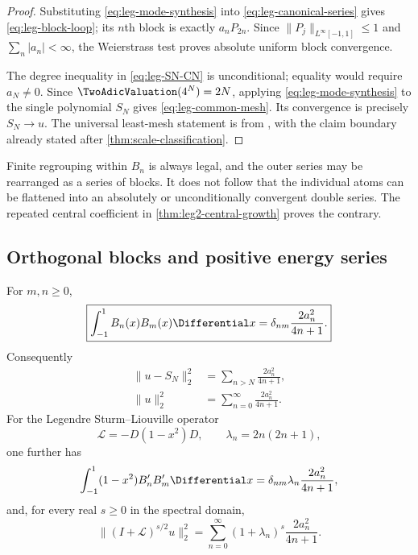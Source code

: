 \begin{proof}
Substituting \eqref{eq:leg-mode-synthesis} into
\eqref{eq:leg-canonical-series} gives \eqref{eq:leg-block-loop}; its $n$th
block is exactly $a_nP_{2n}$.  Since
$\|P_j\|_{L^\infty[-1,1]}\le1$ and $\sum_n|a_n|<\infty$, the Weierstrass
test proves absolute uniform block convergence.

The degree inequality in \eqref{eq:leg-SN-CN} is unconditional; equality
would require $a_N\ne0$.  Since $\TwoAdicValuation(4^N)=2N$, applying
\eqref{eq:leg-mode-synthesis} to the single polynomial $S_N$ gives
\eqref{eq:leg-common-mesh}.  Its convergence is precisely
$S_N\to u$.  The universal least-mesh statement is
 from
, with the claim boundary already stated
after \cref{thm:scale-classification}.
\end{proof}

\begin{warning}
Finite regrouping within $B_n$ is always legal, and the outer series may be
rearranged as a series of blocks.  It does not follow that the individual
atoms can be flattened into an absolutely or unconditionally convergent
double series.  The repeated central coefficient in
 \cref{thm:leg2-central-growth} proves the contrary.
\end{warning}

\subsection{Orthogonal blocks and positive energy series}

\begin{theorem}
\label{thm:leg-block-orthogonality}
For $m,n\ge0$,
\begin{equation}
 \boxed{
 \int_{-1}^{1}B_n(x)B_m(x)\Differential x
 =\delta_{nm}\frac{2a_n^2}{4n+1}.}
 \label{eq:leg-block-orthogonality}
\end{equation}
Consequently
\begin{align}
 \|u-S_N\|_2^2
 &=\sum_{n>N}\frac{2a_n^2}{4n+1},
 \label{eq:leg-L2-tail}\\
 \|u\|_2^2
 &=\sum_{n=0}^{\infty}\frac{2a_n^2}{4n+1}.
 \label{eq:leg-parseval}
\end{align}
For the Legendre Sturm--Liouville operator
\[
 \mathcal L=-D(1-x^2)D,\qquad
 \lambda_n=2n(2n+1),
\]
one further has
\begin{equation}
 \int_{-1}^{1}(1-x^2)B_n'B_m'\Differential x
 =\delta_{nm}\lambda_n\frac{2a_n^2}{4n+1},
 \label{eq:leg-derivative-blocks}
\end{equation}
and, for every real $s\ge0$ in the spectral domain,
\begin{equation}
 \|(I+\mathcal L)^{s/2}u\|_2^2
 =\sum_{n=0}^{\infty}(1+\lambda_n)^s
 \frac{2a_n^2}{4n+1}.
 \label{eq:leg-sobolev-energy}
\end{equation}
\end{theorem}

